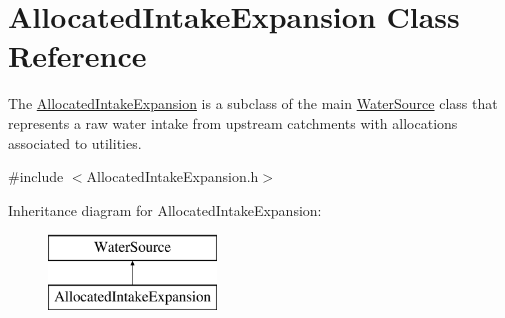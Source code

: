 \hypertarget{classAllocatedIntakeExpansion}{}\section{Allocated\+Intake\+Expansion Class Reference}
\label{classAllocatedIntakeExpansion}


The {\ttfamily \mbox{\hyperlink{classAllocatedIntakeExpansion}{Allocated\+Intake\+Expansion}}} is a subclass of the main {\ttfamily \mbox{\hyperlink{classWaterSource}{Water\+Source}}} class that represents a raw water intake from upstream catchments with allocations associated to utilities.  




{\ttfamily \#include $<$Allocated\+Intake\+Expansion.\+h$>$}

Inheritance diagram for Allocated\+Intake\+Expansion\+:\begin{figure}[H]
\begin{center}
\leavevmode
\includegraphics[height=2.000000cm]{classAllocatedIntakeExpansion}
\end{center}
\end{figure}
